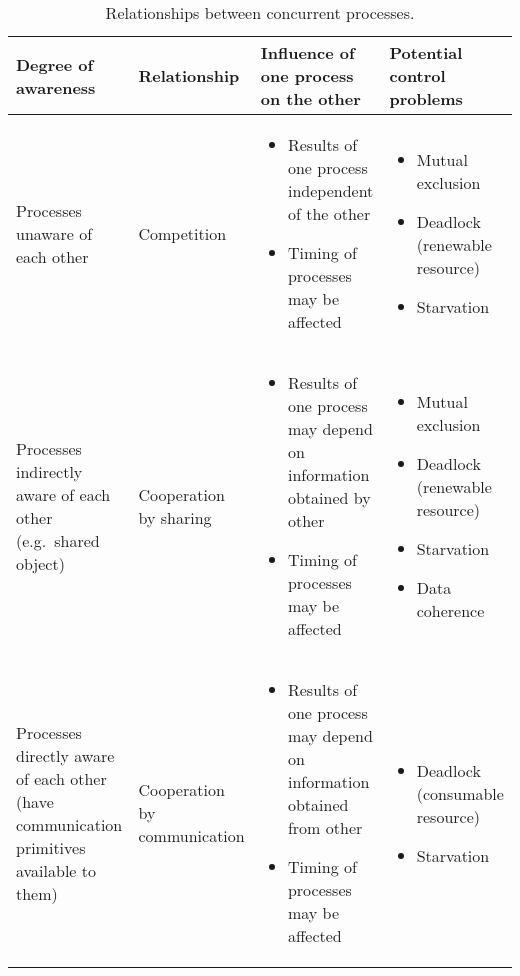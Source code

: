 \begin{table}[htp]
  \centering
  \caption*{Relationships between concurrent processes.}
  \begin{tabular}{p{3cm}p{2cm}p{4cm}p{4cm}}
    \toprule
    Degree of awareness & Relationship & Influence of one process on the other & Potential control problems \\
    \midrule
    Processes unaware of each other & Competition & \begin{itemize}
      \item Results of one process independent of the other
      \item Timing of processes may be affected
    \end{itemize} & \begin{itemize}
      \item Mutual exclusion
      \item Deadlock (renewable resource)
      \item Starvation
    \end{itemize} \\
    Processes indirectly aware of each other (e.g.\ shared object) & Cooperation by sharing & \begin{itemize}
      \item Results of one process may depend on information obtained by other
      \item Timing of processes may be affected
    \end{itemize} & \begin{itemize}
      \item Mutual exclusion
      \item Deadlock (renewable resource)
      \item Starvation
      \item Data coherence
    \end{itemize} \\
    Processes directly aware of each other (have communication primitives available to them) & Cooperation by communication & \begin{itemize}
      \item Results of one process may depend on information obtained from other
      \item Timing of processes may be affected
    \end{itemize} & \begin{itemize}
      \item Deadlock (consumable resource)
      \item Starvation
    \end{itemize} \\
    \bottomrule
  \end{tabular}
\end{table}


